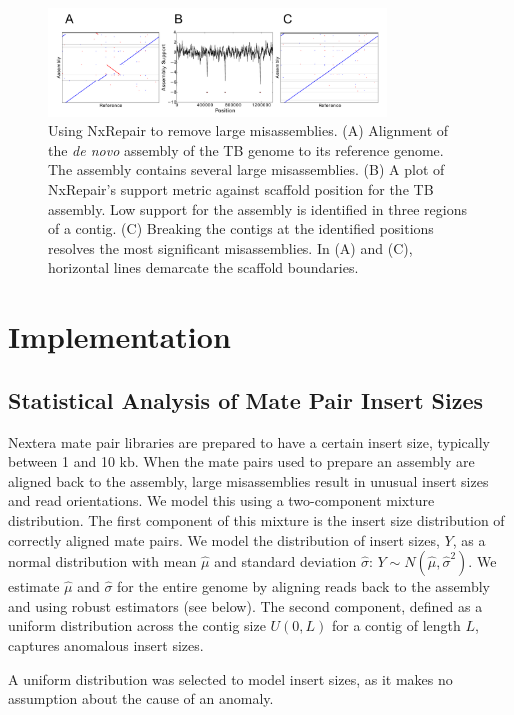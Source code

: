 \documentclass[fleqn,10pt]{wlpeerj}
\begin{document}
\begin{figure}
\centerline{\includegraphics[width=0.8\textwidth]{fig1_nxrepair.pdf}}
\caption{Using NxRepair to remove large misassemblies. (A) Alignment of the \textit{de novo} assembly of the TB genome to its reference genome. The assembly contains several large misassemblies. (B) A plot of NxRepair's support metric against scaffold position for the TB assembly. Low support for the assembly is identified in three regions of a contig. (C) Breaking the contigs at the identified positions resolves the most significant misassemblies. In (A) and (C), horizontal lines demarcate the scaffold boundaries.}\label{fig:NxRepair}
\end{figure}

\section*{Implementation}
\subsection*{Statistical Analysis of Mate Pair Insert Sizes}
Nextera mate pair libraries are prepared to have a certain insert size, typically between 1 and 10 kb. When the mate pairs used to prepare an assembly are aligned back to the assembly, large misassemblies result in unusual insert sizes and read orientations. We model this using a two-component mixture distribution. The first component of this mixture is the insert size distribution of correctly aligned mate pairs.  We model the distribution of insert sizes, $Y$, as a normal distribution with mean $\hat{\mu}$ and standard deviation $\hat{\sigma}$: $Y \sim N(\hat{\mu},\hat{\sigma}^2).$ We estimate $\hat{\mu}$ and $\hat{\sigma}$ for the entire genome by aligning reads back to the assembly and using robust estimators (see below). The second component, defined as a uniform distribution across the contig size $U(0,L)$ for a contig of length $L$, captures anomalous insert sizes. 

A uniform distribution was selected to model insert sizes, as it makes no assumption about the cause of an anomaly. 
\end{document}
